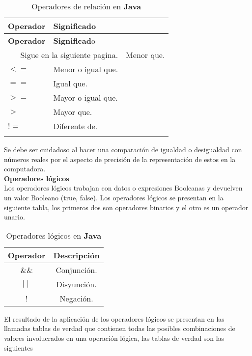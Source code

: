 \documentclass[12pt, A4]{article}
\begin{document}
{{{\begin{longtable}[h]{p{3cm} p{10cm}}
	\hline
	
	\textbf{ Operador} & \textbf{Significado} \\
	\hline\hline
	\endfirsthead
	
	\hline
	\textbf{Operador} & \textbf{ Significad}o \\
	\hline\hline
	\endhead
	
	\multicolumn{2}{r}{Sigue en la siguiente pagina.}
	\endfoot
	
	\endlastfoot
	
	$<$ & Menor que.\\
	$<=$ & Menor o igual que.\\
	$==$ & Igual que.\\
	$>=$ & Mayor o igual que.\\
	$>$ & Mayor que.\\ 
	$!=$ & Diferente de.\\ \hline
		\caption{Operadores de relación en \textbf{Java}}	
\end{longtable}

Se debe ser cuidadoso al hacer una comparación de igualdad o desigualdad con números reales por el aspecto de precisión de la representación de estos en la computadora.\\
\textbf{{{\Large } Operadores lógicos  }}\\ Los operadores lógicos trabajan con datos o expresiones Booleanas y devuelven un valor Booleano (true, false). Los operadores lógicos se presentan en la siguiente tabla, los primeros dos son  operadores binarios y el otro es un operador unario.

\begin{table}[h!]
	\centering
	\begin{tabular}{c | c}
		\textbf{Operador} & \textbf{Descripci\'on}\\ \hline
	\&\&& Conjunción. \\
  $\mid\mid$ & Disyunción.\\
!	& Negación. \\ \hline
	\end{tabular}
	\caption{Operadores lógicos en \textbf{Java}}
\end{table}
El resultado de la aplicación de los operadores lógicos se presentan en las llamadas tablas de verdad que contienen todas las posibles combinaciones de valores involucrados  en una operación lógica, las tablas de verdad son las siguientes 


}}}
\end{document}
